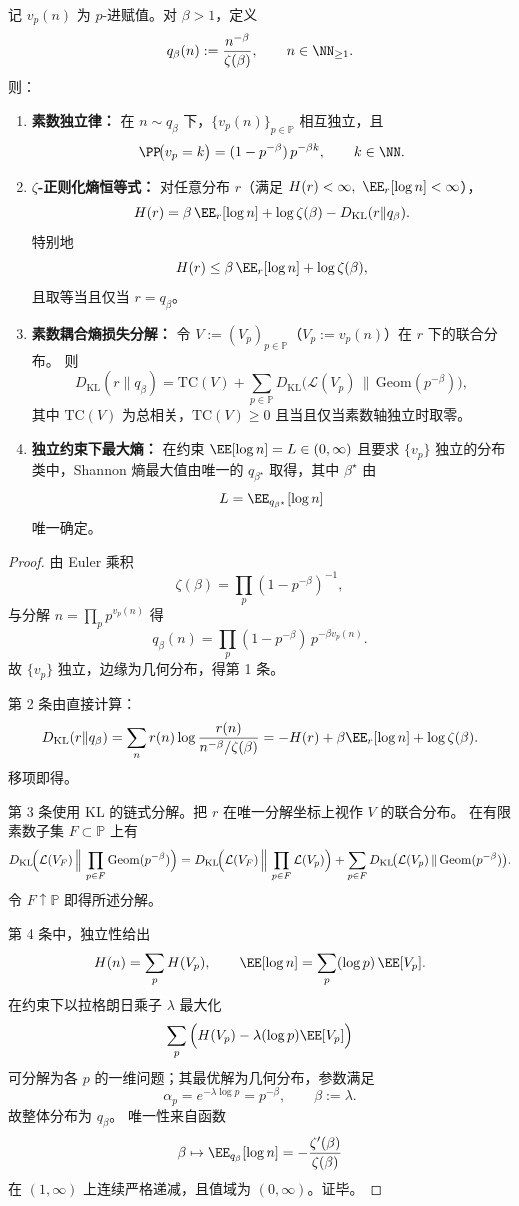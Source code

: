 \begin{theorem}\label{thm:conclusion-zeta-regularized-prime-independence-maxent}
记 \(v_p(n)\) 为 \(p\)-进赋值。对 \(\beta>1\)，定义
\[
q_\beta(n):=\frac{n^{-\beta}}{\zeta(\beta)},\qquad n\in\NN_{\ge 1}.
\]
则：
\begin{enumerate}
  \item \textbf{素数独立律：}
  在 \(n\sim q_\beta\) 下，\(\{v_p(n)\}_{p\in\mathbb P}\) 相互独立，且
  \[
  \PP\!\bigl(v_p=k\bigr)=(1-p^{-\beta})\,p^{-\beta k},\qquad k\in\NN.
  \]
  \item \textbf{\(\zeta\)-正则化熵恒等式：}
  对任意分布 \(r\)（满足 \(H(r)<\infty,\ \EE_r[\log n]<\infty\)），
  \[
  H(r)=\beta\,\EE_r[\log n]+\log\zeta(\beta)-D_{\mathrm{KL}}(r\|q_\beta).
  \]
  特别地
  \[
  H(r)\le \beta\,\EE_r[\log n]+\log\zeta(\beta),
  \]
  且取等当且仅当 \(r=q_\beta\)。
  \item \textbf{素数耦合熵损失分解：}
  令 \(V:=(V_p)_{p\in\mathbb P}\)（\(V_p:=v_p(n)\)）在 \(r\) 下的联合分布。
  则
  \[
  D_{\mathrm{KL}}(r\|q_\beta)
  =\mathrm{TC}(V)+\sum_{p\in\mathbb P}
  D_{\mathrm{KL}}\!\bigl(\mathcal L(V_p)\,\|\,\mathrm{Geom}(p^{-\beta})\bigr),
  \]
  其中 \(\mathrm{TC}(V)\) 为总相关，\(\mathrm{TC}(V)\ge 0\) 且当且仅当素数轴独立时取零。
  \item \textbf{独立约束下最大熵：}
  在约束 \(\EE[\log n]=L\in(0,\infty)\) 且要求 \(\{v_p\}\) 独立的分布类中，Shannon 熵最大值由唯一的 \(q_{\beta^\star}\) 取得，其中 \(\beta^\star\) 由
  \[
  L=\EE_{q_{\beta^\star}}[\log n]
  \]
  唯一确定。
\end{enumerate}
\end{theorem}
\begin{proof}
由 Euler 乘积
\[
\zeta(\beta)=\prod_{p}(1-p^{-\beta})^{-1},
\]
与分解 \(n=\prod_p p^{v_p(n)}\) 得
\[
q_\beta(n)
=\prod_p (1-p^{-\beta})\,p^{-\beta v_p(n)}.
\]
故 \(\{v_p\}\) 独立，边缘为几何分布，得第 1 条。

第 2 条由直接计算：
\[
D_{\mathrm{KL}}(r\|q_\beta)
=\sum_n r(n)\log\frac{r(n)}{n^{-\beta}/\zeta(\beta)}
=-H(r)+\beta\EE_r[\log n]+\log\zeta(\beta).
\]
移项即得。

第 3 条使用 KL 的链式分解。把 \(r\) 在唯一分解坐标上视作 \(V\) 的联合分布。
在有限素数子集 \(F\subset\mathbb P\) 上有
\[
D_{\mathrm{KL}}\!\Bigl(\mathcal L(V_F)\,\Big\|\,\prod_{p\in F}\mathrm{Geom}(p^{-\beta})\Bigr)
=D_{\mathrm{KL}}\!\Bigl(\mathcal L(V_F)\,\Big\|\,\prod_{p\in F}\mathcal L(V_p)\Bigr)
+\sum_{p\in F}D_{\mathrm{KL}}\!\bigl(\mathcal L(V_p)\,\|\,\mathrm{Geom}(p^{-\beta})\bigr).
\]
令 \(F\uparrow\mathbb P\) 即得所述分解。

第 4 条中，独立性给出
\[
H(n)=\sum_p H(V_p),\qquad
\EE[\log n]=\sum_p (\log p)\,\EE[V_p].
\]
在约束下以拉格朗日乘子 \(\lambda\) 最大化
\[
\sum_p\Big(H(V_p)-\lambda(\log p)\EE[V_p]\Big)
\]
可分解为各 \(p\) 的一维问题；其最优解为几何分布，参数满足
\[
\alpha_p=e^{-\lambda\log p}=p^{-\beta},\qquad \beta:=\lambda.
\]
故整体分布为 \(q_\beta\)。
唯一性来自函数
\[
\beta\mapsto \EE_{q_\beta}[\log n]=-\frac{\zeta'(\beta)}{\zeta(\beta)}
\]
在 \((1,\infty)\) 上连续严格递减，且值域为 \((0,\infty)\)。证毕。
\end{proof}

